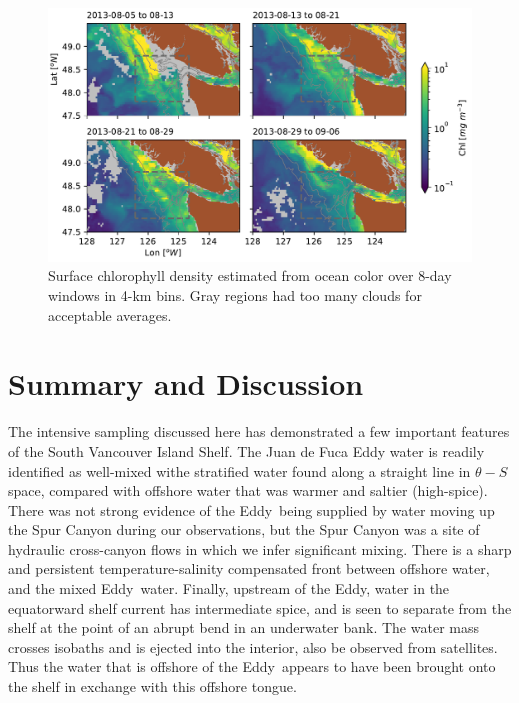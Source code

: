 \documentclass[draft]{agujournal2019}
\newcommand*{\Eddy}{{\sc Eddy}}
\begin{document}
\begin{figure}[htbp]
  \begin{center}
    \includegraphics[width=6.2in]{ChlA}
    \caption{Surface chlorophyll density estimated from ocean color \cite{Huetal12,MODISChlL3} over 8-day windows in 4-km bins. Gray regions had too many clouds for acceptable averages.
      \label{fig:ChlA} }
  \end{center}
\end{figure}


\section{Summary and Discussion}
\label{sec:Summary}

The intensive sampling discussed here has demonstrated a few important features of the South Vancouver Island Shelf.  The Juan de Fuca Eddy water is readily identified as well-mixed withe stratified water found along a straight line in $\theta-S$ space, compared with offshore water that was warmer and saltier (high-spice).   There was not strong evidence of the \Eddy\ being supplied by water moving up the Spur Canyon during our observations, but the Spur Canyon was a site of hydraulic cross-canyon flows in which we infer significant mixing. There is a sharp and persistent temperature-salinity compensated front between offshore water, and the mixed \Eddy\ water.  Finally, upstream of the \Eddy, water in the equatorward shelf current has intermediate spice, and is seen to separate from the shelf at the point of an abrupt bend in an underwater bank.  The water mass crosses isobaths and is ejected into the interior, also be observed from satellites.  Thus the water that is offshore of the \Eddy\ appears to have been brought onto the shelf in exchange with this offshore tongue.
\end{document}
